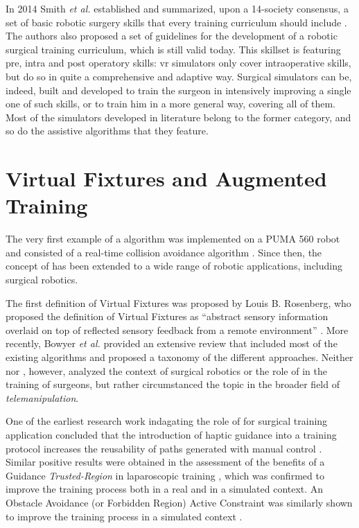 \documentclass[../main.tex]{subfiles}
\begin{document}
In 2014 Smith \textit{et al.} established and summarized, upon a 14-society consensus, a set of basic robotic surgery skills that every training curriculum should include \cite{Smith2014}. 
The authors also proposed a set of guidelines for the development of a robotic surgical training curriculum, which is still valid today. This skillset is featuring pre, intra and post operatory skills: \ac{vr} simulators only cover intraoperative skills, but do so in quite a comprehensive and adaptive way. Surgical simulators can be, indeed, built and developed to train the surgeon in intensively improving a single one of such skills, or to train him in a more general way, covering all of them. Most of the \vr simulators developed in literature belong to the former category, and so do the assistive algorithms that they feature.

\section{Virtual Fixtures and Augmented Training}
The very first example of a \vf algorithm was implemented on a PUMA 560 robot and consisted of a real-time collision avoidance algorithm \cite{Khatib1986}. Since then, the concept of \vf has been extended to a wide range of robotic applications, including surgical robotics. 

The first definition of Virtual Fixtures was proposed by Louis B. Rosenberg, who proposed the definition of Virtual Fixtures as ``abstract sensory information overlaid on top of reflected sensory feedback from a remote environment'' \cite{Rosenberg1993}. More recently, Bowyer \textit{et al.} \cite{Bowyer2014} provided an extensive review that included most of the existing \vf algorithms and proposed a taxonomy of the different approaches. Neither \cite{Rosenberg1993} nor \cite{Bowyer2014}, however, analyzed the context of surgical robotics or the role of \vf in the training of surgeons, but rather circumstanced the topic in the broader field of \textit{telemanipulation}. 

One of the earliest research work indagating the role of \vfs for surgical training application concluded that the introduction of haptic guidance into a training protocol increases the reusability of paths generated with manual control \cite{Payandeh2002}. Similar positive results were obtained in the assessment of the benefits of a Guidance \textit{Trusted-Region} \vf in laparoscopic training \cite{Iranfar2018}, which was confirmed to improve the training process both in a real and in a simulated context. An Obstacle Avoidance (or Forbidden Region) Active Constraint was similarly shown to improve the training process in a simulated context \cite{Hong2016}.

% 
% 
\end{document}
